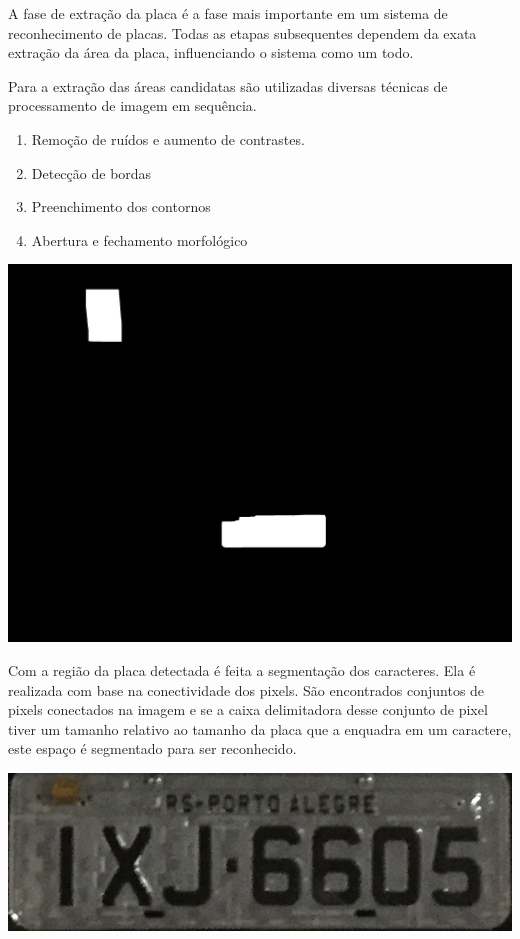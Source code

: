 \documentclass[a0,portrait]{a0poster}
\begin{document}
\begin{multicols}{2}
A fase de extração da placa é a fase mais importante em um sistema de reconhecimento de
placas. Todas as etapas subsequentes dependem da exata extração da área da
placa, influenciando o sistema como um todo.

Para a extração das áreas candidatas são utilizadas diversas técnicas de processamento de
imagem em sequência.

\begin{enumerate}
	\item Remoção de ruídos e aumento de contrastes.
	\item Detecção de bordas
	\item Preenchimento dos contornos
	\item Abertura e fechamento morfológico
\end{enumerate}

\begin{center}
	\includegraphics[width=0.70\linewidth]{9fill_dilated.jpg}
	\label{fig:fill_dilated}
\end{center}

Com a região da placa detectada é feita a segmentação dos caracteres. Ela é realizada
com base na conectividade dos pixels. São encontrados conjuntos de pixels conectados na imagem e
se a caixa delimitadora desse conjunto de pixel tiver um tamanho relativo ao tamanho da placa
que a enquadra em um caractere, este espaço é segmentado para ser reconhecido.

\vspace{2cm}

\begin{center}
	\includegraphics[width=0.70\linewidth]{10roi.jpg}
	\label{fig:license_plate}
\end{center}


\end{multicols}
\end{document}

